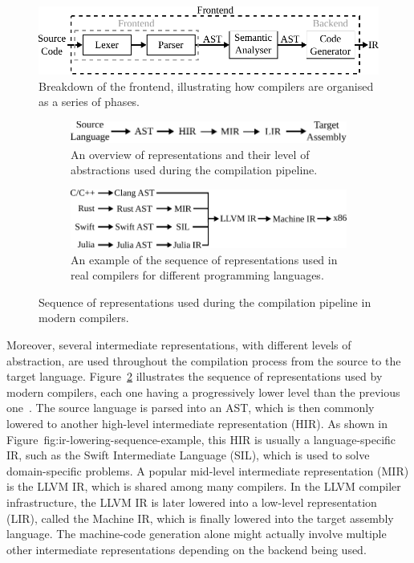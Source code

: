 \begin{figure}[h]
  \centering
  \includegraphics[scale=0.9]{src/background/figs/compiler-frontend.pdf}
  \caption{Breakdown of the frontend, illustrating how compilers are organised as a series of phases.}
  \label{fig:compiler-frontend}
\end{figure}

\begin{figure}[h]
\centering
\begin{subfigure}{\textwidth}
\centering
  \includegraphics[scale=0.9]{src/background/figs/ir-lowering-sequence.pdf}
  \caption{An overview of representations and their level of abstractions used during the compilation pipeline.}
  \label{fig:ir-lowering-sequence-general}
\end{subfigure}
\begin{subfigure}{\textwidth}
\centering
  \includegraphics[scale=0.9]{src/background/figs/ir-lowering-sequence-example.pdf}
  \caption{An example of the sequence of representations used in real compilers for different programming languages.}
  \label{fig:ir-lowering-sequence-example}
\end{subfigure}
\caption{Sequence of representations used during the compilation pipeline in modern compilers.}
\label{fig:ir-lowering-sequence}
\end{figure}

Moreover, several intermediate representations, with different levels of abstraction, are used throughout the compilation process from the source to the target language.
Figure~\ref{fig:ir-lowering-sequence-general} illustrates the sequence of representations used by modern compilers, each one having a progressively lower level than the previous one~\cite{lattner20}.
The source language is parsed into an AST, which is then commonly lowered to another high-level intermediate representation (HIR).
As shown in Figure~{fig:ir-lowering-sequence-example}, this HIR is usually a language-specific IR, such as the Swift Intermediate Language (SIL), which is used to solve domain-specific problems.
A popular mid-level intermediate representation (MIR) is the LLVM IR, which is shared among many compilers.
In the LLVM compiler infrastructure, the LLVM IR is later lowered into a low-level representation (LIR), called the Machine IR, which is finally lowered into the target assembly language.
The machine-code generation alone might actually involve multiple other intermediate representations depending on the backend being used.

